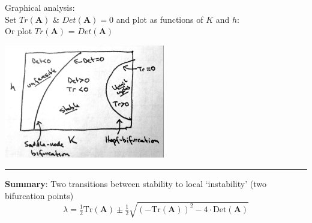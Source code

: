 \documentclass{article}
\newcommand{\ind}{\-\hspace{1cm}}
\begin{document}
Graphical analysis:\\
\ind Set $Tr(\mathbf{A})$ \& $Det(\mathbf{A})=0$ and plot as functions of $K$ and $h$:\\
\ind Or plot $Tr(\mathbf{A})$ = $Det(\mathbf{A})$
\begin{center}
 	\includegraphics[width=7cm]{figs/h_v_K.pdf}\\
\end{center}

\rule[0.5ex]{\linewidth}{1pt}
\pagebreak

\textbf{Summary}: Two transitions between stability to local `instability' (two bifurcation points)
\begin{equation*}
	\lambda = \tfrac{1}{2}\text{Tr}(\textbf{A}) \pm \tfrac{1}{2}\sqrt{(-\text{Tr}(\textbf{A}))^2 - 4\cdot\text{Det}(\textbf{A})} 
\end{equation*}
\end{document}
